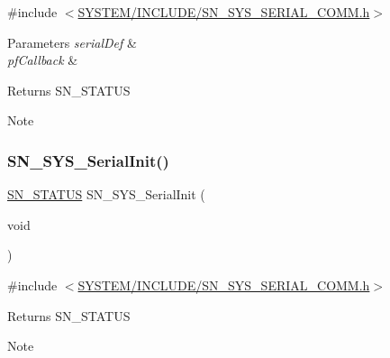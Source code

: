 {\ttfamily \#include $<$\hyperlink{SN__SYS__SERIAL__COMM_8h}{S\+Y\+S\+T\+E\+M/\+I\+N\+C\+L\+U\+D\+E/\+S\+N\+\_\+\+S\+Y\+S\+\_\+\+S\+E\+R\+I\+A\+L\+\_\+\+C\+O\+M\+M.\+h}$>$}


\begin{DoxyParams}{Parameters}
{\em serial\+Def} & \\
\hline
{\em pf\+Callback} & \\
\hline
\end{DoxyParams}
\begin{DoxyReturn}{Returns}
S\+N\+\_\+\+S\+T\+A\+T\+US 
\end{DoxyReturn}
\begin{DoxyNote}{Note}

\end{DoxyNote}
\mbox{\label{group__SYSTEM__SERIAL__COMM_ga62ac6b54ed259351b46ecdb755779e5c}} 
\subsubsection{\texorpdfstring{S\+N\+\_\+\+S\+Y\+S\+\_\+\+Serial\+Init()}{SN\_SYS\_SerialInit()}}
{\footnotesize\ttfamily \hyperlink{group__SYSTEM__ERROR_ga4540713b9a7a18ce44d78c3a10f7442f}{S\+N\+\_\+\+S\+T\+A\+T\+US} S\+N\+\_\+\+S\+Y\+S\+\_\+\+Serial\+Init (\begin{DoxyParamCaption}\item[{void}]{ }\end{DoxyParamCaption})}



{\ttfamily \#include $<$\hyperlink{SN__SYS__SERIAL__COMM_8h}{S\+Y\+S\+T\+E\+M/\+I\+N\+C\+L\+U\+D\+E/\+S\+N\+\_\+\+S\+Y\+S\+\_\+\+S\+E\+R\+I\+A\+L\+\_\+\+C\+O\+M\+M.\+h}$>$}

\begin{DoxyReturn}{Returns}
S\+N\+\_\+\+S\+T\+A\+T\+US 
\end{DoxyReturn}
\begin{DoxyNote}{Note}

\end{DoxyNote}
\mbox{\label{group__SYSTEM__SERIAL__COMM_ga8644661ec9dba59ae309766a0b29c741}} 
